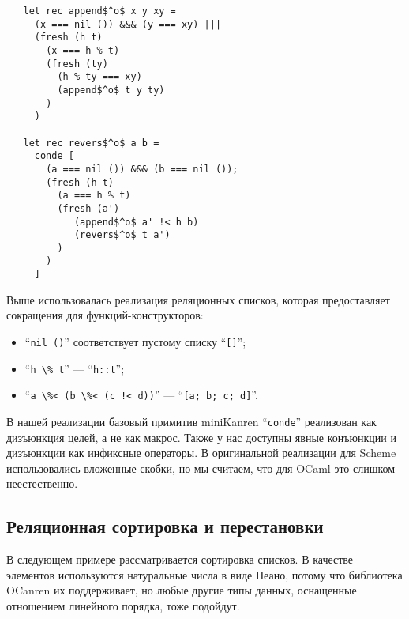\begin{lstlisting}
   let rec append$^o$ x y xy =
     (x === nil ()) &&& (y === xy) |||
     (fresh (h t)
       (x === h % t)
       (fresh (ty)
         (h % ty === xy)
         (append$^o$ t y ty)
       )
     )

   let rec revers$^o$ a b =
     conde [
       (a === nil ()) &&& (b === nil ());
       (fresh (h t)
         (a === h % t)
         (fresh (a')
            (append$^o$ a' !< h b)
            (revers$^o$ t a')
         )
       )
     ]
\end{lstlisting}

Выше использовалась реализация реляционных списков, которая предоставляет сокращения для функций-конструкторов:

\begin{itemize}
  \item \enquote{\lstinline=nil ()=} соответствует пустому списку \enquote{\lstinline=[]=};
  \item \enquote{\lstinline[mathescape=false]=h \% t=} --- \enquote{\lstinline[mathescape=false]=h::t=};
  \item \enquote{\lstinline=a \%< (b \%< (c !< d))=} --- \enquote{\lstinline=[a; b; c; d]=}.
\end{itemize}

В нашей реализации базовый примитив miniKanren \enquote{\lstinline|conde|} реализован как дизъюнкция целей, а не как макрос.
Также у нас доступны явные конъюнкции и дизъюнкции как инфиксные операторы.
В оригинальной реализации для Scheme использовались вложенные скобки, но мы считаем, что для OCaml это слишком неестественно.


\subsection{Реляционная сортировка и перестановки}

В следующем примере рассматривается сортировка списков.
В качестве элементов используются натуральные числа в виде Пеано, потому что библиотека OCanren их поддерживает, но любые другие типы данных, оснащенные отношением линейного порядка, тоже подойдут.

